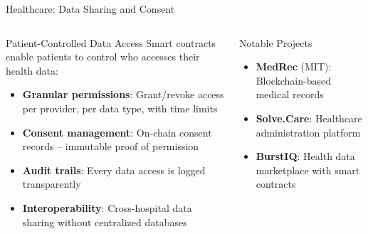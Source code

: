 \documentclass[8pt,aspectratio=169]{beamer}
\begin{document}
\begin{frame}{Healthcare: Data Sharing and Consent}
\begin{columns}[T]
\begin{block}{Patient-Controlled Data Access}
\footnotesize
Smart contracts enable patients to control who accesses their health data:
\begin{itemize}
  \item \textbf{Granular permissions}: Grant/revoke access per provider, per data type, with time limits
  \item \textbf{Consent management}: On-chain consent records -- immutable proof of permission
  \item \textbf{Audit trails}: Every data access is logged transparently
  \item \textbf{Interoperability}: Cross-hospital data sharing without centralized databases
\end{itemize}
\end{block}
\vspace{2mm}
\begin{exampleblock}{Notable Projects}
\footnotesize
\begin{itemize}
  \item \textbf{MedRec} (MIT): Blockchain-based medical records
  \item \textbf{Solve.Care}: Healthcare administration platform
  \item \textbf{BurstIQ}: Health data marketplace with smart contracts
\end{itemize}
\end{exampleblock}


\end{columns}
\end{frame}
\end{document}
